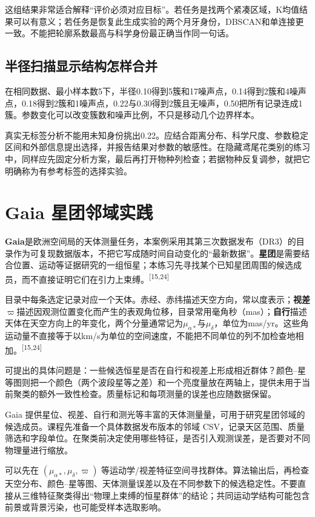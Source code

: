这组结果非常适合解释“评价必须对应目标”。若任务是找两个紧凑区域，K均值结果可以有意义；若任务是恢复此生成实验的两个月牙身份，DBSCAN和单连接更一致。不能把轮廓系数最高与科学身份最正确当作同一句话。

\subsection{半径扫描显示结构怎样合并}
在相同数据、最小样本数5下，半径0.10得到5簇和17噪声点，0.14得到2簇和4噪声点，0.18得到2簇和1噪声点，0.22与0.30得到2簇且无噪声，0.50把所有记录连成1簇。参数变化可以改变簇数和噪声比例，不只是移动几个边界样本。

真实无标签分析不能用未知身份挑出0.22。应结合距离分布、科学尺度、参数稳定区间和外部信息提出选择，并报告结果对参数的敏感性。在隐藏鸢尾花类别的练习中，同样应先固定分析方案，最后再打开物种列检查；若据物种反复调参，就把它明确称为有参考标签的选择实验。

\section{Gaia 星团邻域实践}

\label{sec:gaia-intro}
\textbf{Gaia}是欧洲空间局的天体测量任务，本案例采用其第三次数据发布（DR3）的目录作为可复现数据版本，不把它写成随时间自动变化的“最新数据”。\textbf{星团}是需要结合位置、运动等证据研究的一组恒星；本练习先寻找某个已知星团周围的候选成员，而不直接证明它们在引力上束缚。\textsuperscript{[15,24]}

目录中每条选定记录对应一个天体。赤经、赤纬描述天空方向，常以度表示；\textbf{视差}$\varpi$描述因观测位置变化而产生的表观角位移，目录常用毫角秒（mas）；\textbf{自行}描述天体在天空方向上的年变化，两个分量通常记为$\mu_{\alpha*}$与$\mu_\delta$，单位为mas/yr。这些角运动量不直接等于以km/s为单位的空间速度，不能把不同单位的列不加检查地相加。\textsuperscript{[15,24]}

可提出的具体问题是：一些候选恒星是否在自行和视差上形成相近群体？颜色--星等图则把一个颜色（两个波段星等之差）和一个亮度量放在两轴上，提供未用于当前聚类的额外一致性检查。质量标记和每项测量的误差也应随数据保留。

Gaia 提供星位、视差、自行和测光等丰富的天体测量量，可用于研究星团邻域的候选成员。课程先准备一个具体数据发布版本的邻域 CSV，记录天区范围、质量筛选和字段单位。在聚类前决定使用哪些特征，是否引入观测误差，是否要对不同物理量进行缩放。

可以先在 $(\mu_{\alpha *},\mu_\delta,\varpi)$ 等运动学/视差特征空间寻找群体。算法输出后，再检查天空分布、颜色--星等图、天体测量误差以及在不同参数下的候选稳定性。不要直接从三维特征聚类得出“物理上束缚的恒星群体”的结论；共同运动学结构可能包含前景或背景污染，也可能受样本选取影响。


